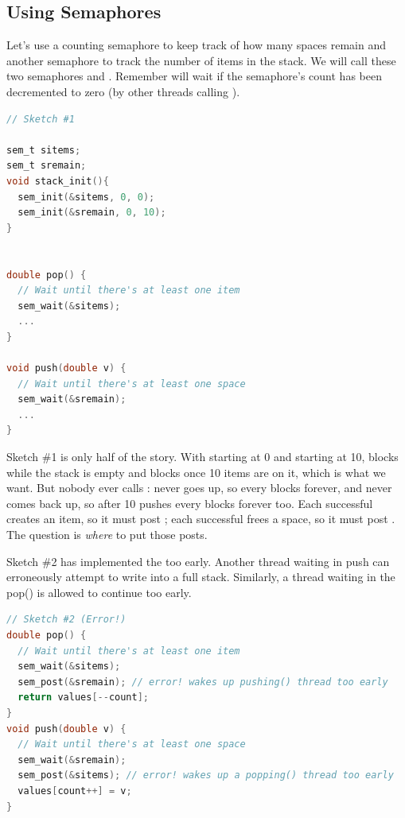 \subsection{Using Semaphores}

Let's use a counting semaphore to keep track of how many spaces remain and another semaphore to track the number of items in the stack.
We will call these two semaphores  and .
Remember  will wait if the semaphore's count has been decremented to zero (by other threads calling ).

\begin{lstlisting}[language=C]
// Sketch #1

sem_t sitems;
sem_t sremain;
void stack_init(){
  sem_init(&sitems, 0, 0);
  sem_init(&sremain, 0, 10);
}


double pop() {
  // Wait until there's at least one item
  sem_wait(&sitems);
  ...
}

void push(double v) {
  // Wait until there's at least one space
  sem_wait(&sremain);
  ...
}
\end{lstlisting}

Sketch \#1 is only half of the story.
With  starting at 0 and  starting at 10,  blocks while the stack is empty and  blocks once 10 items are on it, which is what we want.
But nobody ever calls :  never goes up, so every  blocks forever, and  never comes back up, so after 10 pushes every  blocks forever too.
Each successful  creates an item, so it must post ; each successful  frees a space, so it must post .
The question is \emph{where} to put those posts.

Sketch \#2 has implemented the  too early.
Another thread waiting in push can erroneously attempt to write into a full stack.
Similarly, a thread waiting in the pop() is allowed to continue too early.

\begin{lstlisting}[language=C]
// Sketch #2 (Error!)
double pop() {
  // Wait until there's at least one item
  sem_wait(&sitems);
  sem_post(&sremain); // error! wakes up pushing() thread too early
  return values[--count];
}
void push(double v) {
  // Wait until there's at least one space
  sem_wait(&sremain);
  sem_post(&sitems); // error! wakes up a popping() thread too early
  values[count++] = v;
}
\end{lstlisting}

